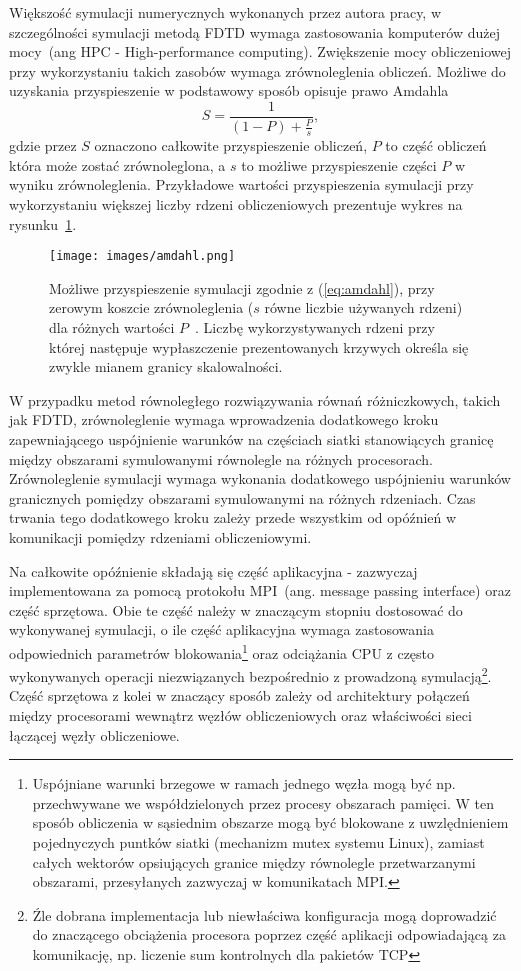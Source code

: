 
Większość symulacji numerycznych wykonanych przez autora pracy, w szczególności symulacji metodą FDTD wymaga zastosowania komputerów dużej mocy~(ang HPC - High-performance computing). Zwiększenie mocy obliczeniowej przy wykorzystaniu takich zasobów wymaga zrównoleglenia obliczeń. Możliwe do uzyskania przyspieszenie w podstawowy sposób opisuje prawo Amdahla
\begin{equation}
	S=\frac{1}{(1-P)+\frac{P}{s}},
	\label{eq:amdahl}
\end{equation}
gdzie przez $S$ oznaczono całkowite przyspieszenie obliczeń, $P$ to część obliczeń która może zostać zrównoleglona, a $s$ to możliwe przyspieszenie części $P$ w wyniku zrównoleglenia. Przykładowe wartości przyspieszenia symulacji przy wykorzystaniu większej liczby rdzeni obliczeniowych prezentuje wykres na rysunku~\ref{fig:amdhal}.

\begin{figure}[h]
	\texttt{[image: images/amdahl.png]}
	\caption{Możliwe przyspieszenie symulacji zgodnie z (\ref{eq:amdahl}), przy zerowym koszcie zrównoleglenia ($s$ równe liczbie używanych rdzeni) dla różnych wartości $P$~\cite{wiki:amdhal}. Liczbę wykorzystywanych rdzeni przy której następuje wypłaszczenie prezentowanych krzywych określa się zwykle mianem granicy skalowalności.}
	\label{fig:amdhal}
\end{figure}

W przypadku metod równoległego rozwiązywania równań różniczkowych, takich jak FDTD, zrównoleglenie wymaga wprowadzenia dodatkowego kroku zapewniającego uspójnienie warunków na częściach siatki stanowiących granicę między obszarami symulowanymi równolegle na różnych procesorach. Zrównoleglenie symulacji wymaga wykonania dodatkowego uspójnieniu warunków granicznych pomiędzy obszarami symulowanymi na różnych rdzeniach. Czas trwania tego dodatkowego kroku zależy przede wszystkim od opóźnień w komunikacji pomiędzy rdzeniami obliczeniowymi. 

Na całkowite opóźnienie składają się część aplikacyjna - zazwyczaj implementowana za pomocą protokołu MPI~(ang. message passing interface) oraz część sprzętowa. Obie te część należy w znaczącym stopniu dostosować do wykonywanej symulacji, o ile część aplikacyjna wymaga zastosowania odpowiednich parametrów blokowania\footnote{Uspójniane warunki brzegowe w ramach jednego węzła mogą być np. przechwywane we współdzielonych przez procesy obszarach pamięci. W ten sposób obliczenia w sąsiednim obszarze mogą być blokowane z uwzlędnieniem pojednyczych puntków siatki (mechanizm mutex systemu Linux), zamiast całych wektorów opsiujących granice między równolegle przetwarzanymi obszarami, przesyłanych zazwyczaj w komunikatach MPI.} oraz odciążania CPU z często wykonywanych operacji niezwiązanych bezpośrednio z prowadzoną symulacją\footnote{Źle dobrana implementacja lub niewłaściwa konfiguracja mogą doprowadzić do znaczącego obciążenia procesora poprzez część aplikacji odpowiadającą za komunikację, np. liczenie sum kontrolnych dla pakietów TCP}. Część sprzętowa z kolei w znaczący sposób zależy od architektury połączeń między procesorami wewnątrz węzłów obliczeniowych oraz właściwości sieci łączącej węzły obliczeniowe. 

